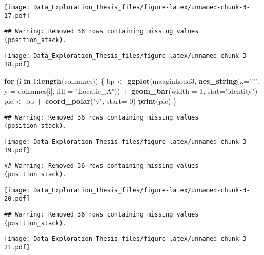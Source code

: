 \documentclass[]{article}
\newenvironment{Shaded}{\begin{snugshade}}{\end{snugshade}}
\newcommand{\KeywordTok}[1]{\textcolor[rgb]{0.13,0.29,0.53}{\textbf{#1}}}
\newcommand{\DataTypeTok}[1]{\textcolor[rgb]{0.13,0.29,0.53}{#1}}
\newcommand{\DecValTok}[1]{\textcolor[rgb]{0.00,0.00,0.81}{#1}}
\newcommand{\StringTok}[1]{\textcolor[rgb]{0.31,0.60,0.02}{#1}}
\newcommand{\ControlFlowTok}[1]{\textcolor[rgb]{0.13,0.29,0.53}{\textbf{#1}}}
\newcommand{\OperatorTok}[1]{\textcolor[rgb]{0.81,0.36,0.00}{\textbf{#1}}}
\newcommand{\NormalTok}[1]{#1}
\begin{document}
\texttt{[image: Data\_Exploration\_Thesis\_files/figure-latex/unnamed-chunk-3-17.pdf]}

\begin{verbatim}
## Warning: Removed 36 rows containing missing values (position_stack).
\end{verbatim}

\texttt{[image: Data\_Exploration\_Thesis\_files/figure-latex/unnamed-chunk-3-18.pdf]}

\begin{Shaded}
\begin{Highlighting}[]
\ControlFlowTok{for}\NormalTok{ (i }\ControlFlowTok{in} \DecValTok{1}\OperatorTok{:}\KeywordTok{length}\NormalTok{(colnames)) \{}
\NormalTok{  bp <-}\StringTok{ }\KeywordTok{ggplot}\NormalTok{(maaginhoud3, }\KeywordTok{aes_string}\NormalTok{(}\DataTypeTok{x=}\StringTok{"''"}\NormalTok{, }\DataTypeTok{y =}\NormalTok{ colnames[i], }\DataTypeTok{fill =} \StringTok{"Locatie_A"}\NormalTok{)) }\OperatorTok{+}
\StringTok{    }\KeywordTok{geom_bar}\NormalTok{(}\DataTypeTok{width =} \DecValTok{1}\NormalTok{, }\DataTypeTok{stat=}\StringTok{"identity"}\NormalTok{)}
\NormalTok{  pie <-}\StringTok{ }\NormalTok{bp }\OperatorTok{+}\StringTok{ }\KeywordTok{coord_polar}\NormalTok{(}\StringTok{"y"}\NormalTok{, }\DataTypeTok{start=} \DecValTok{0}\NormalTok{)}
  \KeywordTok{print}\NormalTok{(pie)}
\NormalTok{\}}
\end{Highlighting}
\end{Shaded}

\begin{verbatim}
## Warning: Removed 36 rows containing missing values (position_stack).
\end{verbatim}

\texttt{[image: Data\_Exploration\_Thesis\_files/figure-latex/unnamed-chunk-3-19.pdf]}

\begin{verbatim}
## Warning: Removed 36 rows containing missing values (position_stack).
\end{verbatim}

\texttt{[image: Data\_Exploration\_Thesis\_files/figure-latex/unnamed-chunk-3-20.pdf]}

\begin{verbatim}
## Warning: Removed 36 rows containing missing values (position_stack).
\end{verbatim}

\texttt{[image: Data\_Exploration\_Thesis\_files/figure-latex/unnamed-chunk-3-21.pdf]}
\end{document}

